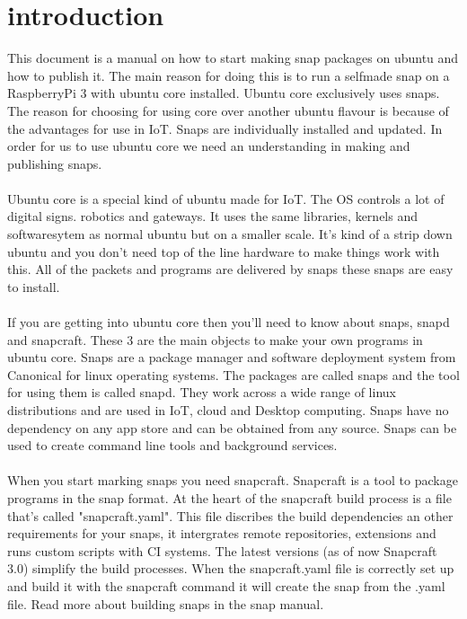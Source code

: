 \documentclass{article}
\begin{document}
\section{introduction}\label{sec:intro}%
This document is a manual on how to start making snap packages on ubuntu and how to publish it. The main reason for doing this is to run a selfmade snap on a RaspberryPi 3 with ubuntu core installed. Ubuntu core exclusively uses snaps. The reason for choosing for using core over another ubuntu flavour is because of the advantages for use in IoT. Snaps are individually installed and updated. In order for us to use ubuntu core we need an understanding in making and publishing snaps.\\ 
\\
Ubuntu core is a special kind of ubuntu made for IoT. The OS controls a lot of digital signs. robotics and gateways. It uses the same libraries, kernels and softwaresytem as normal ubuntu but on a smaller scale. It's kind of a strip down ubuntu and you don't need top of the line hardware to make things work with this. All of the packets and programs are delivered by snaps these snaps are easy to install. \\
\\
If you are getting into ubuntu core then you'll need to know about snaps, snapd and snapcraft. These 3 are the main objects to make your own programs in ubuntu core. Snaps are a package manager and software deployment system from Canonical for linux operating systems. The packages are called snaps and the tool for using them is called snapd. They work across a wide range of linux distributions and are used in IoT, cloud and Desktop computing. Snaps have no dependency on any app store and can be obtained from any source. Snaps can be used to create command line tools and background services.\\
\\
When you start marking snaps you need snapcraft. Snapcraft is a tool to package programs in the snap format. At the heart of the snapcraft build process is a file that's called "snapcraft.yaml". This file discribes the build dependencies an other requirements for your snaps, it intergrates remote repositories, extensions and runs custom scripts with CI systems. The latest versions (as of now Snapcraft 3.0) simplify the build processes. When the snapcraft.yaml file is correctly set up and build it with the snapcraft command it will create the snap from the .yaml file. Read more about building snaps in the snap manual.\\
\\	
\end{document}
